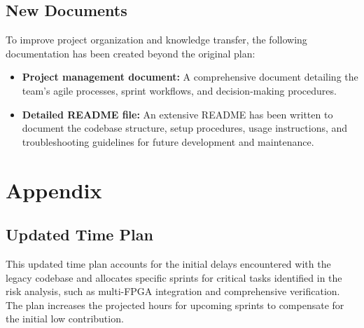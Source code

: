\documentclass[10pt]{article}
\begin{document}
\subsection{New Documents}
To improve project organization and knowledge transfer, the following documentation has been created beyond the original plan:

\begin{itemize}
    \item \textbf{Project management document:} A comprehensive document detailing the team's agile processes, sprint workflows, and decision-making procedures.
    
    \item \textbf{Detailed README file:} An extensive README has been written to document the codebase structure, setup procedures, usage instructions, and troubleshooting guidelines for future development and maintenance.
\end{itemize}


\section{Appendix}

\subsection{Updated Time Plan}

This updated time plan accounts for the initial delays encountered with the legacy codebase and allocates specific sprints for critical tasks identified in the risk analysis, such as multi-FPGA integration and comprehensive verification. The plan increases the projected hours for upcoming sprints to compensate for the initial low contribution.
\end{document}
